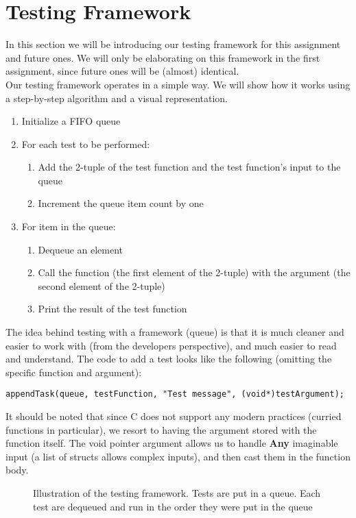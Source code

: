 \documentclass[a4paper]{article}
\begin{document}
\section{Testing Framework}
In this section we will be introducing our testing framework for this assignment and future ones.
We will only be elaborating on this framework in the first assignment, since future ones will be
 (almost) identical.\\
Our testing framework operates in a simple way. We will show how it works using a step-by-step algorithm and a visual representation.\\
\begin{enumerate}
    \item Initialize a FIFO queue
    \item For each test to be performed:
    \begin{enumerate}
        \item Add the 2-tuple of the test function and the test function's input to the queue
        \item Increment the queue item count by one
    \end{enumerate}
    \item For item in the queue:
    \begin{enumerate}
        \item Dequeue an element
        \item Call the function (the first element of the 2-tuple) with the argument (the second element of the 2-tuple)
        \item Print the result of the test function
    \end{enumerate}
\end{enumerate}
The idea behind testing with a framework (queue) is that it is much cleaner and easier to work with (from the developers perspective),
and much easier to read and understand. The code to add a test looks like the following (omitting the specific function and argument):
\begin{verbatim}
appendTask(queue, testFunction, "Test message", (void*)testArgument);
\end{verbatim}
It should be noted that since C does not support any modern practices (curried functions in particular), we resort to having the argument stored with the function itself. The void pointer argument allows us to handle \textbf{Any} imaginable input (a list of structs allows complex inputs), and then cast them in the function body.

\begin{figure}
    \centering
    
    \caption{Illustration of the testing framework. Tests are put in a queue. Each test are dequeued and run in the order they were put in the queue}
    \label{fig:my_label}
\end{figure}
\end{document}
